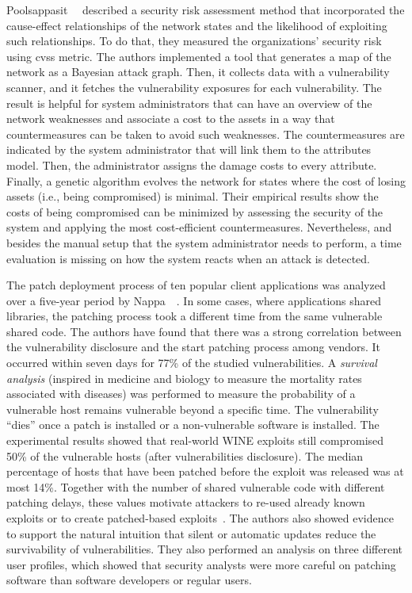 Poolsappasit~\etal{}~\cite{Poolsappasit:2012} described a security risk assessment method that incorporated the cause-effect relationships of the network states and the likelihood of exploiting such relationships.
To do that, they measured the organizations' security risk using \gls{cvss} metric.
The authors implemented a tool that generates a map of the network as a Bayesian attack graph.
Then, it collects data with a vulnerability scanner, and it fetches the vulnerability exposures for each vulnerability.
The result is helpful for system administrators that can have an overview of the network weaknesses and associate a cost to the assets in a way that countermeasures can be taken to avoid such weaknesses.
The countermeasures are indicated by the system administrator that will link them to the attributes model.
Then, the administrator assigns the damage costs to every attribute.
Finally, a genetic algorithm evolves the network for states where the cost of losing assets (i.e., being compromised) is minimal. 
Their empirical results show the costs of being compromised can be minimized by assessing the security of the system and applying the most cost-efficient countermeasures.
Nevertheless, and besides the manual setup that the system administrator needs to perform, a time evaluation is missing on how the system reacts when an attack is detected.


The patch deployment process of ten popular client applications was analyzed over a five-year period by Nappa~\etal{}~\cite{Nappa:2015}.
In some cases, where applications shared libraries, the patching process took a different time from the same vulnerable shared code.
The authors have found that there was a strong correlation between the vulnerability disclosure and the start patching process among vendors.
It occurred within seven days for 77\% of the studied vulnerabilities.
A \emph{survival analysis} (inspired in medicine and biology to measure the mortality rates associated with diseases) was performed to measure the probability of a vulnerable host remains vulnerable beyond a specific time.
The vulnerability ``dies'' once a patch is installed or a non-vulnerable software is installed.
The experimental results showed that real-world WINE exploits still compromised 50\% of the vulnerable hosts (after vulnerabilities disclosure). 
The median percentage of hosts that have been patched before the exploit was released was at most 14\%.
Together with the number of shared vulnerable code with different patching delays, these values motivate attackers to re-used already known exploits or to create patched-based exploits~\cite{Brumley:2008}.
The authors also showed evidence to support the natural intuition that silent or automatic updates reduce the survivability of vulnerabilities. 
They also performed an analysis on three different user profiles, which showed that security analysts were more careful on patching software than software developers or regular users.


